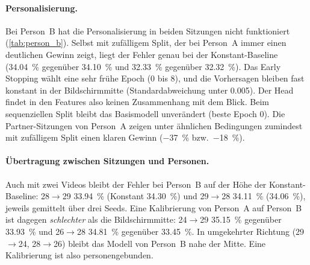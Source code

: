 \paragraph{Personalisierung.} Bei Person~B hat die Personalisierung in beiden
Sitzungen nicht funktioniert (\cref{tab:person_b}). Selbst mit zufälligem Split,
der bei Person~A immer einen deutlichen Gewinn zeigt, liegt der Fehler genau bei
der Konstant-Baseline (\SI{34,04}{\percent} gegenüber \SI{34,10}{\percent} und
\SI{32,33}{\percent} gegenüber \SI{32,32}{\percent}). Das Early Stopping wählt
eine sehr frühe Epoch (0 bis 8), und die Vorhersagen bleiben fast konstant in
der Bildschirmmitte (Standardabweichung unter \num{0,005}). Der Head findet in
den Features also keinen Zusammenhang mit dem Blick. Beim sequenziellen Split
bleibt das Basismodell unverändert (beste Epoch 0). Die Partner-Sitzungen von
Person~A zeigen unter ähnlichen Bedingungen zumindest mit zufälligem Split einen
klaren Gewinn ($-$\SI{37}{\percent} bzw.\ $-$\SI{18}{\percent}).

\paragraph{Übertragung zwischen Sitzungen und Personen.} Auch mit zwei Videos
bleibt der Fehler bei Person~B auf der Höhe der Konstant-Baseline: 28$\to$29
\SI{33,94}{\percent} (Konstant \SI{34,30}{\percent}) und 29$\to$28
\SI{34,11}{\percent} (\SI{34,06}{\percent}), jeweils gemittelt über drei Seeds.
Eine Kalibrierung von Person~A auf Person~B ist dagegen \emph{schlechter} als
die Bildschirmmitte: 24$\to$29 \SI{35,15}{\percent} gegenüber
\SI{33,93}{\percent} und 26$\to$28 \SI{34,81}{\percent} gegenüber
\SI{33,45}{\percent}. In umgekehrter Richtung (29$\to$24, 28$\to$26) bleibt das
Modell von Person~B nahe der Mitte. Eine Kalibrierung ist also personengebunden.

